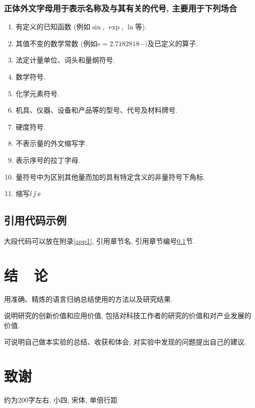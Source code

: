 \documentclass{urtemp}
\begin{document}
\subsubsection{正体外文字母用于表示名称及与其有关的代号, 主要用于下列场合}
\begin{enumerate}
\renewcommand{\labelenumi}{(\theenumi)}
\item 有定义的已知函数 (例如$\sin$, $\exp$, $\ln$等). 
\item 其值不变的数学常数 (例如$\mathrm{e} = 2.718 281 8\cdots)$及已定义的算子. 
\item 法定计量单位、词头和量纲符号. 
\item 数学符号. 
\item 化学元素符号. 
\item 机具、仪器、设备和产品等的型号、代号及材料牌号. 
\item 硬度符号. 
\item 不表示量的外文缩写字. 
\item 表示序号的拉丁字母. 
\item 量符号中为区别其他量而加的具有特定含义的非量符号下角标.
\item 缩写$\ii\ \jj\ \ee$ 
\end{enumerate} 

\subsection{引用代码示例}\label{sec:yinyong}



大段代码可以放在附录\ref{app1}, 引用章节名, 引用章节编号\ref{sec:yinyong}节.

\section{结~~论}
用准确、精炼的语言归纳总结使用的方法以及研究结果. 

说明研究的创新价值和应用价值, 包括对科技工作者的研究的价值和对产业发展的价值. 

可说明自己做本实验的总结、收获和体会, 对实验中发现的问题提出自己的建议. 



{\centering\section*{致谢}}
约为200字左右, 小四, 宋体, 单倍行距
\end{document}
